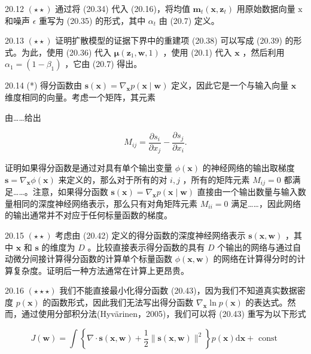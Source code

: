 \documentclass[10pt]{article}
\begin{document}
20.12 \(\left( {\star  \star  }\right)\) 通过将 (20.34) 代入 (20.16)，将均值 \({\mathbf{m}}_{t}\left( {\mathbf{x},{\mathbf{z}}_{t}}\right)\) 用原始数据向量 \(\mathrm{x}\) 和噪声 \(\epsilon\) 重写为 (20.35) 的形式，其中 \({\alpha }_{t}\) 由 (20.7) 定义。

20.13 \(\left( {\star  \star  }\right)\) 证明扩散模型的证据下界中的重建项 (20.38) 可以写成 (20.39) 的形式。为此，使用 (20.36) 代入 \(\mathbf{\mu }\left( {{\mathbf{z}}_{1},\mathbf{w},1}\right)\) ，使用 (20.1) 代入 \(\mathbf{x}\) ，然后利用 \({\alpha }_{1} = \left( {1 - {\beta }_{1}}\right)\) ，它由 (20.7) 得出。

20.14 (*) 得分函数由 \(\mathbf{s}\left( \mathbf{x}\right)  = {\nabla }_{\mathbf{x}}p\left( {\mathbf{x} \mid  \mathbf{w}}\right)\) 定义，因此它是一个与输入向量 \(\mathbf{x}\) 维度相同的向量。考虑一个矩阵，其元素

由……给出

\[
{M}_{ij} = \frac{\partial {s}_{i}}{\partial {x}_{j}} - \frac{\partial {s}_{j}}{\partial {x}_{i}}. \tag{20.64}
\]

证明如果得分函数是通过对具有单个输出变量 \(\phi \left( \mathbf{x}\right)\) 的神经网络的输出取梯度 \(\mathbf{s} = {\nabla }_{\mathbf{x}}\phi \left( \mathbf{x}\right)\) 来定义的，那么对于所有的对 \(i,j\) ，所有的矩阵元素 \({M}_{ij} = 0\) 都满足……。注意，如果得分函数 \(\mathbf{s}\left( \mathbf{x}\right)  = {\nabla }_{\mathbf{x}}p\left( {\mathbf{x} \mid  \mathbf{w}}\right)\) 直接由一个输出数量与输入数量相同的深度神经网络表示，那么只有对角矩阵元素 \({M}_{ii} = 0\) 满足……，因此网络的输出通常并不对应于任何标量函数的梯度。

20.15 \(\left( {\star  \star  }\right)\) 考虑由 (20.42) 定义的得分函数的深度神经网络表示 \(\mathbf{s}\left( {\mathbf{x},\mathbf{w}}\right)\) ，其中 \(\mathbf{x}\) 和 \(\mathbf{s}\) 的维度为 \(D\) 。比较直接表示得分函数的具有 \(D\) 个输出的网络与通过自动微分间接计算得分函数的计算单个标量函数 \(\phi \left( {\mathbf{x},\mathbf{w}}\right)\) 的网络在计算得分时的计算复杂度。证明后一种方法通常在计算上更昂贵。

20.16 \(\left( {\star  \star   \star  }\right)\) 我们不能直接最小化得分函数 (20.43)，因为我们不知道真实数据密度 \(p\left( \mathbf{x}\right)\) 的函数形式，因此我们无法写出得分函数 \({\nabla }_{\mathbf{x}}\ln p\left( \mathbf{x}\right)\) 的表达式。然而，通过使用分部积分法(Hyvärinen，2005)，我们可以将 (20.43) 重写为以下形式

\[
J\left( \mathbf{w}\right)  = \int \left\{  {\nabla  \cdot  \mathbf{s}\left( {\mathbf{x},\mathbf{w}}\right)  + \frac{1}{2}\parallel \mathbf{s}\left( {\mathbf{x},\mathbf{w}}\right) {\parallel }^{2}}\right\}  p\left( \mathbf{x}\right) \mathrm{d}\mathbf{x} + \text{ const } \tag{20.65}
\]
\end{document}
